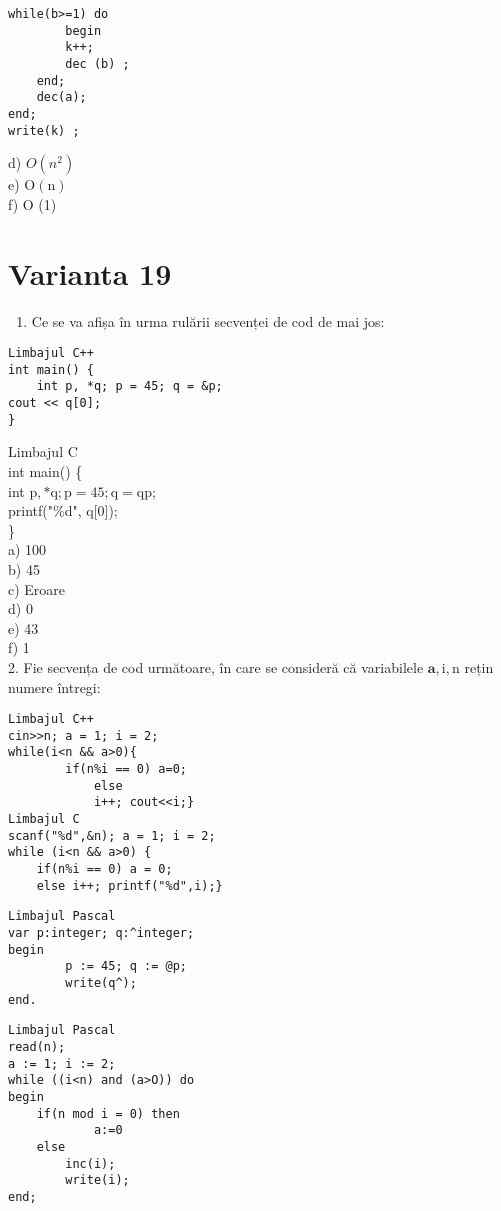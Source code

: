 \begin{verbatim}
while(b>=1) do
        begin
        k++;
        dec (b) ;
    end;
    dec(a);
end;
write(k) ;
\end{verbatim}

d) $O\left(n^{2}\right)$\\
e) $\mathrm{O}(\mathrm{n})$\\
f) O (1)

\section*{Varianta 19}
\begin{enumerate}
  \item Ce se va afișa în urma rulării secvenței de cod de mai jos:
\end{enumerate}

\begin{verbatim}
Limbajul C++
int main() {
    int p, *q; p = 45; q = &p;
cout << q[0];
}
\end{verbatim}

Limbajul C\\
int main() \{\\
int $\mathrm{p}, * \mathrm{q} ; \mathrm{p}=45 ; \mathrm{q}=\mathrm{q} \mathrm{p}$;\\[0pt]
printf("\%d", q[0]);\\
\}\\
a) 100\\
b) 45\\
c) Eroare\\
d) 0\\
e) 43\\
f) 1\\
2. Fie secvența de cod următoare, în care se consideră că variabilele $\mathbf{a}, \mathrm{i}, \mathrm{n}$ rețin numere întregi:

\begin{verbatim}
Limbajul C++
cin>>n; a = 1; i = 2;
while(i<n && a>0){
        if(n%i == 0) a=0;
            else
            i++; cout<<i;}
Limbajul C
scanf("%d",&n); a = 1; i = 2;
while (i<n && a>0) {
    if(n%i == 0) a = 0;
    else i++; printf("%d",i);}
\end{verbatim}

\begin{verbatim}
Limbajul Pascal
var p:integer; q:^integer;
begin
        p := 45; q := @p;
        write(q^);
end.
\end{verbatim}

\begin{verbatim}
Limbajul Pascal
read(n);
a := 1; i := 2;
while ((i<n) and (a>O)) do
begin
    if(n mod i = 0) then
            a:=0
    else
        inc(i);
        write(i);
end;
\end{verbatim}

